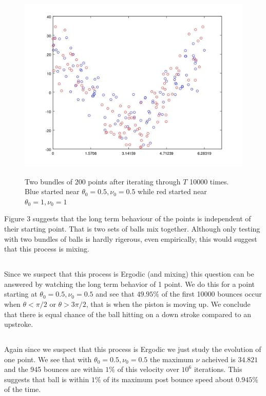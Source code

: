 \documentclass{unswmaths}
\begin{document}
\clearpage
\begin{figure}[h]
    \includegraphics[scale=0.5]{Question_6_Mixing}
    \label{qn_6_mixing}
    \caption{Two bundles of 200 points after iterating through  $ T $ 10000 times. Blue started near $ \theta_0 = 0.5, \nu_0 = 0.5 $ while red started near $ \theta_0 = 1, \nu_0 = 1 $ }
\end{figure}


Figure 3 suggests that the long term behaviour of the  points is independent of their starting point. That is two sets of balls mix together. Although only testing with two bundles of balls is hardly rigerous, even empirically, this would suggest that this process is mixing.
\subsection{}
Since we suspect that this process is Ergodic (and mixing) this question can be answered by watching the long term behavior of 1 point. We do this for a point starting at $ \theta_0 = 0.5, \nu_0 = 0.5 $ and see that $ 49.95 \% $ of the first 10000 bounces occur when $ \theta < \pi / 2 $ or $ \theta > 3\pi / 2 $, that is when the piston is moving up. We conclude that there is equal chance of the ball hitting on a down stroke compared to an upstroke.

\subsection{}
Again since we suspect that this process is Ergodic we just study the evolution of one point.
We see that with $ \theta_0 = 0.5, \nu_0 = 0.5 $ the maximum $ \nu $ acheived is $ 34.821 $ and the 945 bounces are within $ 1\%$ of this velocity over $ 10^6 $ iterations. This suggests that ball is within $ 1\%$ of its maximum post bounce speed about $ 0.945\% $ of the time.
\end{document}
